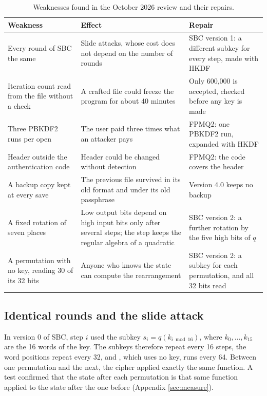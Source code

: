 \begin{table}[ht]
\centering
\begin{tabular}{>{\raggedright\arraybackslash}p{}
                >{\raggedright\arraybackslash}p{}
                >{\raggedright\arraybackslash}p{}}
\hline
\textbf{Weakness} & \textbf{Effect} & \textbf{Repair} \\
\hline
Every round of SBC the same &
Slide attacks, whose cost does not depend on the number of rounds &
SBC version 1: a different subkey for every step, made with HKDF \\
Iteration count read from the file without a check &
A crafted file could freeze the program for about 40 minutes &
Only 600,000 is accepted, checked before any key is made \\
Three PBKDF2 runs per open &
The user paid three times what an attacker pays &
FPMQ2: one PBKDF2 run, expanded with HKDF \\
Header outside the authentication code &
Header could be changed without detection &
FPMQ2: the code covers the header \\
A backup copy kept at every save &
The previous file survived in its old format and under its old passphrase &
Version 4.0 keeps no backup \\
A fixed rotation of seven places &
Low output bits depend on high input bits only after several steps; the step
keeps the regular algebra of a quadratic &
SBC version 2: a further rotation by the five high bits of $q$ \\
A permutation with no key, reading 30 of its 32 bits &
Anyone who knows the state can compute the rearrangement &
SBC version 2: a subkey for each permutation, and all 32 bits read \\
\hline
\end{tabular}
\caption{Weaknesses found in the October 2026 review and their repairs.}
\label{tab:fixes}
\end{table}

\subsection{Identical rounds and the slide attack}
\label{sec:slide}

In version 0 of SBC, step $i$ used the subkey $s_i = q(k_{i \bmod 16})$, where
$k_0, \ldots, k_{15}$ are the 16 words of the key. The subkeys therefore
repeat every 16 steps, the word positions repeat every 32, and ,
which uses no key, runs every 64. Between one permutation and the next, the
cipher applied exactly the same function. A test confirmed that the state after
each permutation is that same function applied to the state after the one
before (Appendix \ref{sec:measure}).

